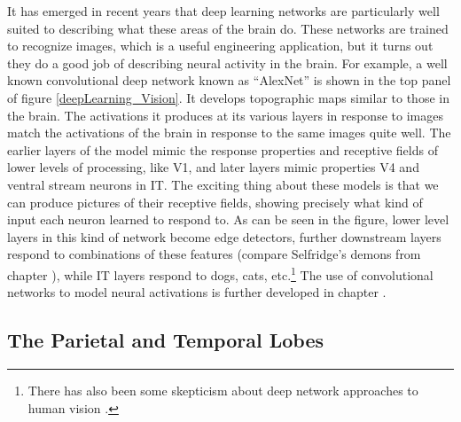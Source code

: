It has emerged in recent years that deep learning networks are particularly well suited to describing what these areas of the brain do. These networks are trained to recognize images, which is a useful engineering application, but it turns out they do a good job of describing neural activity in the brain. For example, a well known convolutional deep network known as ``AlexNet'' \cite{krizhevsky2012imagenet} is shown in the top panel of figure \ref{deepLearning_Vision}. It develops topographic maps similar to those in the brain. The activations it produces at its various layers in response to images match the activations of the brain in response to the same images quite well. The earlier layers of the model mimic the response properties and receptive fields of lower levels of processing, like V1, and later layers mimic properties V4 and ventral stream neurons in IT. The exciting thing about these models is that we can produce pictures of their receptive fields, showing precisely what kind of input each neuron learned to respond to. As can be seen in the figure, lower level layers in this kind of network become edge detectors, further downstream layers respond to combinations of these features (compare Selfridge's demons from chapter ), while IT layers respond to dogs, cats, etc.\footnote{There has also been some skepticism about deep network approaches to human vision \cite{bowers2022deep}.} The use of convolutional networks to model neural activations is further developed in chapter .

\subsection{The Parietal and Temporal Lobes}

